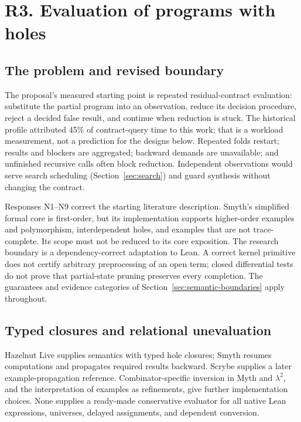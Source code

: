 \section{R3. Evaluation of programs with holes}\label{sec:evaluation}

\subsection{The problem and revised boundary}\label{sec:evaluation-scope}

The proposal's measured starting point is repeated residual-contract evaluation:
substitute the partial program into an observation, reduce its decision
procedure, reject a decided false result, and continue when reduction is
stuck. The historical profile attributed 45\% of contract-query time to this
work; that is a workload measurement, not a prediction for the designs below.
Repeated folds restart; results and blockers are aggregated; backward demands
are unavailable; and unfinished recursive calls often block reduction.
Independent observations would serve search scheduling
(Section~\ref{sec:search}) and guard synthesis without changing the contract.

Responses N1--N9 correct the starting literature description. Smyth's simplified
formal core is first-order, but its implementation supports higher-order
examples and polymorphism, interdependent holes, and examples that are not
trace-complete\cite{smyth}. Its scope must not be reduced to its core exposition.
The research boundary is a dependency-correct adaptation to Lean. A correct
kernel primitive does not certify arbitrary preprocessing of an open term;
closed differential tests do not prove that partial-state pruning preserves
every completion. The guarantees and evidence categories of
Section~\ref{sec:semantic-boundaries} apply throughout.

\subsection{Typed closures and relational unevaluation}\label{sec:evaluation-closures}

Hazelnut Live supplies semantics with typed hole closures; Smyth resumes
computations and propagates required results backward. Scrybe supplies a later
example-propagation reference. Combinator-specific inversion in Myth and
$\lambda^2$, and the interpretation of examples as refinements, give further
implementation choices\cite{hazel,smyth,scrybe,myth,lambda2,frankle16}.
None supplies a ready-made conservative evaluator for all native Lean
expressions, universes, delayed assignments, and dependent conversion.

